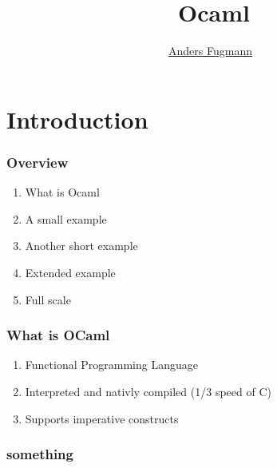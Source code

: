 \documentclass[mathserif,xcolor=svgnames]{beamer}
\renewcommand{\_}{\mathunderscore}
\begin{document}
\title[OCaml]{\
  Ocaml
}
\author[Anders Fugmann]{\
  \normalfont \underline{Anders Fugmann}
}
\date{}

\maketitle

\section{Introduction}

\begin{frame}
  \frametitle{Overview}

  \begin{enumerate}
  \item What is Ocaml
  \item A small example
  \item Another short example
  \item Extended example
  \item Full scale
  \end{enumerate}
\end{frame}

\begin{frame}[fragile]
   \frametitle{What is OCaml}
   \begin{enumerate}
   \item Functional Programming Language
   \item Interpreted and nativly compiled (1/3 speed of C)
   \item Supports imperative constructs
   \end{enumerate}
\end{frame}






\begin{frame}[fragile]
  \frametitle{something}
\end{frame}
\end{document}
